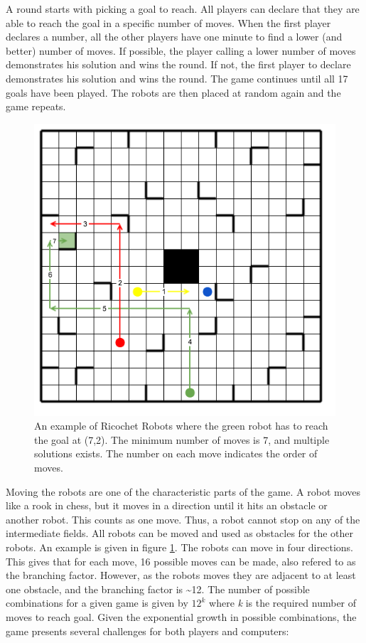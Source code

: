 \documentclass[]{article}
\begin{document}
A round starts with picking a goal to reach. All players can declare
that they are able to reach the goal in a specific number of moves. When
the first player declares a number, all the other players have one
minute to find a lower (and better) number of moves. If possible, the
player calling a lower number of moves demonstrates his solution and
wins the round. If not, the first player to declare demonstrates his
solution and wins the round. The game continues until all 17 goals have
been played. The robots are then placed at random again and the game
repeats.

\begin{figure}[htb]
\centering
\includegraphics[width=0.6\linewidth]{img/example.png}
\caption{An example of Ricochet Robots where the green robot has to reach the goal at (7,2). The minimum number of moves is 7, and multiple solutions exists. The number on each move indicates the order of moves.}
\label{fig:example}
\end{figure}

Moving the robots are one of the characteristic parts of the game. A
robot moves like a rook in chess, but it moves in a direction until it
hits an obstacle or another robot. This counts as one move. Thus, a
robot cannot stop on any of the intermediate fields. All robots can be
moved and used as obstacles for the other robots. An example is given in
figure \ref{fig:example}. The robots can move in four directions. This
gives that for each move, 16 possible moves can be made, also refered to
as the branching factor. However, as the robots moves they are adjacent
to at least one obstacle, and the branching factor is
\textasciitilde{}12. The number of possible combinations for a given
game is given by \(12^k\) where \emph{k} is the required number of moves
to reach goal. Given the exponential growth in possible combinations,
the game presents several challenges for both players and computers:
\end{document}
